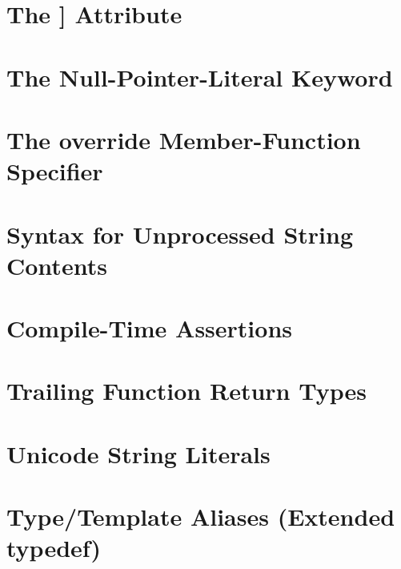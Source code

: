 \newpage
\section[{\tt noreturn}]{The {\SecCode [[noreturn]]} Attribute}\label{the-noreturn-attribute}


\newpage
\section[{\tt nullptr}]{The Null-Pointer-Literal Keyword}\label{null-pointer-literal-(nullptr)}



\newpage
\section[{\tt override}]{The {\SecCode override} Member-Function Specifier}\label{override}


\newpage
\section[Raw String Literals '14]{Syntax for Unprocessed String Contents}\label{raw-string-literals}


\newpage
\section[{\tt static\_assert}]{Compile-Time Assertions}\label{compile-time-assertions-(static_assert)}


\newpage
\section[Trailing Return]{Trailing Function Return Types}\label{trailing-function-return-types}


\newpage
\section[Unicode Literals]{Unicode String Literals}\label{unicode-string-and-character-literals}


\newpage
\section[{\tt using} Aliases]{Type/Template Aliases (Extended {\SecCode typedef})}\label{alias-declarations-and-alias-templates}




